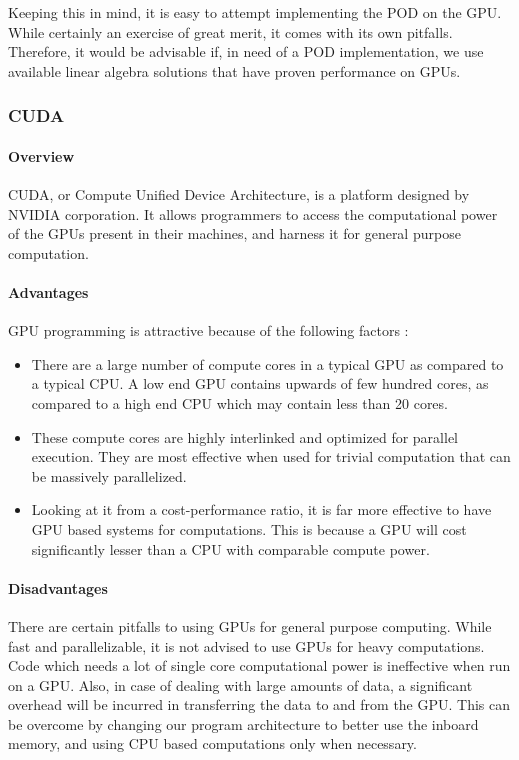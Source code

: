 \documentclass[submit]{aiaa-tc_mod}%
\begin{document}
Keeping this in mind, it is easy to attempt implementing the POD on the GPU. While certainly an exercise of great merit, it comes with its own pitfalls. Therefore, it would be advisable if, in need of a POD implementation, we use available linear algebra solutions that have proven performance on GPUs. 

\clearpage

\subsubsection{CUDA}
\paragraph{Overview}
CUDA, or Compute Unified Device Architecture, is a platform designed by NVIDIA corporation. It allows programmers to access the computational power of the GPUs present in their machines, and harness it for general purpose computation. 

\paragraph{Advantages}
GPU programming is attractive because of the following factors : 
\begin{itemize}
\item 
There are a large number of compute cores in a typical GPU as compared to a typical CPU. A low end GPU contains upwards of few hundred cores, as compared to a high end CPU which may contain less than 20 cores.

\item
These compute cores are highly interlinked and optimized for parallel execution. They are most effective when used for trivial computation that can be massively parallelized.

\item 
Looking at it from a cost-performance ratio, it is far more effective to have GPU based systems for computations. This is because a GPU will cost significantly lesser than a CPU with comparable compute power. 
\end{itemize}

\paragraph{Disadvantages}
There are certain pitfalls to using GPUs for general purpose computing. While fast and parallelizable, it is not advised to use GPUs for heavy computations. Code which needs a lot of single core computational power is ineffective when run on a GPU. Also, in case of dealing with large amounts of data, a significant overhead will be incurred in transferring the data to and from the GPU. This can be overcome by changing our program architecture to better use the inboard memory, and using CPU based computations only when necessary. 
\end{document}
